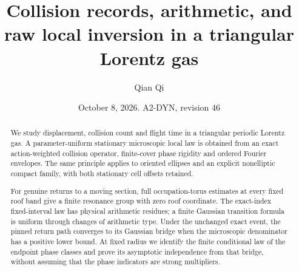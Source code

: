 \documentclass[11pt,reqno]{amsart}
\title[Collision records and raw local inversion]{Collision records, arithmetic, and raw local inversion in a triangular Lorentz gas}
\author{Qian Qi}
\date{October 8, 2026. A2-DYN, revision 46}
\numberwithin{equation}{section}
\theoremstyle{definition}\newtheorem{definition}[theorem]{Definition}
\theoremstyle{remark}\newtheorem{remark}[theorem]{Remark}
\begin{document}
\raggedbottom
\begin{abstract}
We study displacement, collision count and flight time in a triangular
periodic Lorentz gas. A parameter-uniform stationary microscopic local
law is obtained from an exact action-weighted collision operator,
finite-cover phase rigidity and ordered Fourier envelopes. The same
principle applies to oriented ellipses and an explicit nonelliptic
compact family, with both stationary cell offsets retained.

For genuine returns to a moving section, full occupation-torus
estimates at every fixed roof band give a finite resonance group with
zero roof coordinate. The exact-index fixed-interval law has physical
arithmetic residues; a finite Gaussian transition formula is uniform
through changes of arithmetic type. Under the unchanged exact event,
the pinned return path converges to its Gaussian bridge when the
microscopic denominator has a positive lower bound. At fixed radius
we identify the finite conditional law of the endpoint phase classes
and prove its asymptotic independence from that bridge, without
assuming that the phase indicators are strong multipliers.


\end{abstract}
\end{document}
